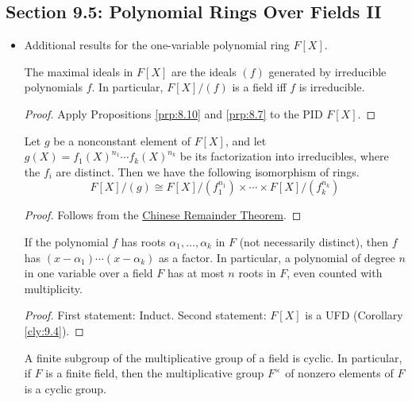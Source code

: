 \documentclass[../notes.tex]{subfiles}
\begin{document}
\subsection*{Section 9.5: Polynomial Rings Over Fields II}
\begin{itemize}
    \item Additional results for the one-variable polynomial ring $F[X]$.
    \begin{proposition}\label{prp:9.15}
        The maximal ideals in $F[X]$ are the ideals $(f)$ generated by irreducible polynomials $f$. In particular, $F[X]/(f)$ is a field iff $f$ is irreducible.
        \begin{proof}
            Apply Propositions \ref{prp:8.10} and \ref{prp:8.7} to the PID $F[X]$.
        \end{proof}
    \end{proposition}
    \begin{proposition}\label{prp:9.16}
        Let $g$ be a nonconstant element of $F[X]$, and let $g(X)=f_1(X)^{n_1}\cdots f_k(X)^{n_k}$ be its factorization into irreducibles, where the $f_i$ are distinct. Then we have the following isomorphism of rings.
        \begin{equation*}
            F[X]/(g) \cong F[X]/(f_1^{n_1})\times\cdots\times F[X]/(f_k^{n_k})
        \end{equation*}
        \begin{proof}
            Follows from the \hyperref[trm:7.17]{Chinese Remainder Theorem}.
        \end{proof}
    \end{proposition}
    \begin{proposition}\label{prp:9.17}
        If the polynomial $f$ has roots $\alpha_1,\dots,\alpha_k$ in $F$ (not necessarily distinct), then $f$ has $(x-\alpha_1)\cdots(x-\alpha_k)$ as a factor. In particular, a polynomial of degree $n$ in one variable over a field $F$ has at most $n$ roots in $F$, even counted with multiplicity.
        \begin{proof}
            First statement: Induct. Second statement: $F[X]$ is a UFD (Corollary \ref{cly:9.4}).
        \end{proof}
    \end{proposition}
    \begin{proposition}\label{prp:9.18}
        A finite subgroup of the multiplicative group of a field is cyclic. In particular, if $F$ is a finite field, then the multiplicative group $F^\times$ of nonzero elements of $F$ is a cyclic group.

\end{proposition}
\end{itemize}
\end{document}
